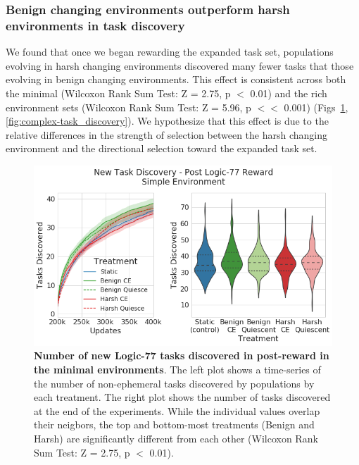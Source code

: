 \documentclass[PhD]{msu-thesis}
\begin{document}
\subsubsection{Benign changing environments outperform harsh environments in task discovery}
We found that once we began rewarding the expanded task set, populations evolving in harsh changing environments discovered many fewer tasks that those evolving in benign changing environments. This effect is consistent across both the minimal (Wilcoxon Rank Sum Test: Z = 2.75, p $<$ 0.01) and the rich environment sets (Wilcoxon Rank Sum Test: Z = 5.96, p $<<$ 0.001) (Figs~\ref{fig:postreward_task_discovery}, \ref{fig:complex-task_discovery}). We hypothesize that this effect is due to the relative differences in the strength of selection between the harsh changing environment and the directional selection toward the expanded task set. 
	\begin{figure}[!h]
	\includegraphics[width=0.95\columnwidth]{figures/LTE/lte-simple-post_reward_task_discovery.png}
	\caption{\textbf{Number of new Logic-77 tasks discovered in post-reward in the minimal environments}. The left plot shows a time-series of the number of non-ephemeral tasks discovered by populations by each treatment. The right plot shows the number of tasks discovered at the end of the experiments. While the individual values overlap their neigbors, the top and bottom-most treatments (Benign and Harsh) are significantly different from each other (Wilcoxon Rank Sum Test: Z = 2.75, p $<$ 0.01). %
	}
	\label{fig:postreward_task_discovery}
	\end{figure} 
\end{document}
